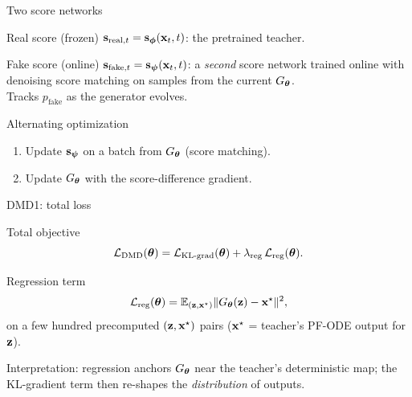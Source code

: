 \documentclass{beamer}
\renewcommand{\eqpause}{}
\begin{document}
\begin{frame}{Two score networks}
	\begin{block}{Real score (frozen)}
		$\mathbf{s}_{\text{real}, t} = \mathbf{s}_{\boldsymbol{\phi}}(\mathbf{x}_t, t)$: the pretrained teacher.
	\end{block}
	\eqpause
	\begin{block}{Fake score (online)}
		$\mathbf{s}_{\text{fake}, t} = \mathbf{s}_{\boldsymbol{\psi}}(\mathbf{x}_t, t)$: a \emph{second} score network trained online with denoising score matching on samples from the current $G_{\boldsymbol{\theta}}$.
		\\
		Tracks $p_{\text{fake}}$ as the generator evolves.
	\end{block}
	\eqpause
	\begin{block}{Alternating optimization}
		\begin{enumerate}
			\item Update $\mathbf{s}_{\boldsymbol{\psi}}$ on a batch from $G_{\boldsymbol{\theta}}$ (score matching).
			\item Update $G_{\boldsymbol{\theta}}$ with the score-difference gradient.
		\end{enumerate}
	\end{block}
\end{frame}
\begin{frame}{DMD1: total loss}
	\begin{block}{Total objective}
		\vspace{-0.3cm}
		\[
			\mathcal{L}_{\text{DMD}}(\boldsymbol{\theta}) = \mathcal{L}_{\text{KL-grad}}(\boldsymbol{\theta}) + \lambda_{\text{reg}}\, \mathcal{L}_{\text{reg}}(\boldsymbol{\theta}).
		\]
	\end{block}
	\eqpause
	\begin{block}{Regression term}
		\vspace{-0.3cm}
		\[
			\mathcal{L}_{\text{reg}}(\boldsymbol{\theta}) = \mathbb{E}_{(\mathbf{z}, \mathbf{x}^\star)} \| G_{\boldsymbol{\theta}}(\mathbf{z}) - \mathbf{x}^\star \|^2,
		\]
		on a few hundred precomputed $(\mathbf{z}, \mathbf{x}^\star)$ pairs ($\mathbf{x}^\star$ = teacher's PF-ODE output for $\mathbf{z}$).
	\end{block}
	\eqpause
	Interpretation: regression anchors $G_{\boldsymbol{\theta}}$ near the teacher's deterministic map; the KL-gradient term then re-shapes the \emph{distribution} of outputs.
\end{frame}
\end{document}
